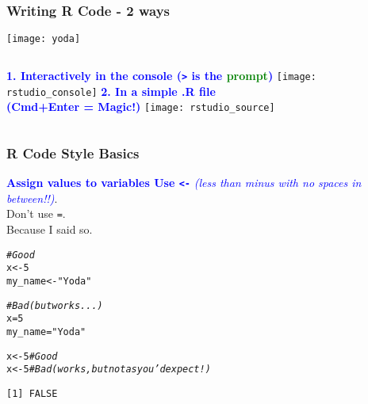 \documentclass[13pt,aspectratio=169]{beamer}\usepackage[]{graphicx}\usepackage[]{color}
\makeatletter
\newcommand{\hlnum}[1]{\textcolor[rgb]{0.686,0.059,0.569}{#1}}%
\newcommand{\hlstr}[1]{\textcolor[rgb]{0.192,0.494,0.8}{#1}}%
\newcommand{\hlcom}[1]{\textcolor[rgb]{0.678,0.584,0.686}{\textit{#1}}}%
\newcommand{\hlopt}[1]{\textcolor[rgb]{0,0,0}{#1}}%
\newcommand{\hlstd}[1]{\textcolor[rgb]{0.345,0.345,0.345}{#1}}%
\newcommand{\hlkwb}[1]{\textcolor[rgb]{0.69,0.353,0.396}{#1}}%
\newenvironment{kframe}{%
 \def\at@end@of@kframe{}%
 \ifinner\ifhmode%
  \def\at@end@of@kframe{\end{minipage}}%
  \begin{minipage}{\columnwidth}%
 \fi\fi%
 \def\FrameCommand##1{\hskip\@totalleftmargin \hskip-\fboxsep
 \colorbox{shadecolor}{##1}\hskip-\fboxsep
     \hskip-\linewidth \hskip-\@totalleftmargin \hskip\columnwidth}%
 \MakeFramed {\advance\hsize-\width
   \@totalleftmargin\z@ \linewidth\hsize
   \@setminipage}}%
 {\par\unskip\endMakeFramed%
 \at@end@of@kframe}
\newenvironment{knitrout}{}{} %
\newcommand{\tc}[2]{\textcolor{#1}{#2}}
\renewcommand{\tt}[1]{\texttt{#1}}
\renewenvironment{knitrout}{\setlength{\topsep}{0mm}}{}
\makeatother
\begin{document}
\begin{frame}
    \frametitle{Writing R Code - 2 ways}
    \begin{center}
	\texttt{[image: yoda]}
    \end{center}
\end{frame}

\begin{frame}
    \begin{columns}[b]
	\textbf{\tc{Blue}{\LARGE{1. Interactively in the console (\tt{>} is
		    the \tc{green}{prompt})}}}
	\vskip10pt
	\texttt{[image: rstudio\_console]}
	\textbf{\tc{Blue}{\LARGE{2. In a simple .R file \\
		    (Cmd+Enter = Magic!)}}}
	\vskip10pt
	\texttt{[image: rstudio\_source]}
    \end{columns}
\end{frame}

\begin{frame}[fragile]
    \frametitle{R Code Style Basics}
    \tc{Blue}{\textbf{Assign values to variables
	    \vskip10pt
	    Use \tt{<-}}
	\textit{(less than minus with \alert{no spaces} in between!!)}}.\\
    Don't use \alert{\tt{=}}.\\ Because I said so.
\begin{knitrout}\small
{}\color{fgcolor}\begin{kframe}
\begin{alltt}
\hlcom{# Good}
\hlstd{x} \hlkwb{<-} \hlnum{5}
\hlstd{my_name} \hlkwb{<-} \hlstr{"Yoda"}

\hlcom{# Bad (but works...)}
\hlstd{x} \hlkwb{=} \hlnum{5}
\hlstd{my_name} \hlkwb{=} \hlstr{"Yoda"}
\end{alltt}
\end{kframe}
\end{knitrout}
\begin{knitrout}\small
{}\color{fgcolor}\begin{kframe}
\begin{alltt}
\hlstd{x} \hlkwb{<-} \hlnum{5} \hlcom{# Good}
\hlstd{x} \hlopt{< -} \hlnum{5} \hlcom{# Bad (works, but not as you'd expect!)}
\end{alltt}
\begin{verbatim}
[1] FALSE
\end{verbatim}
\end{kframe}
\end{knitrout}

\end{frame}
\end{document}
